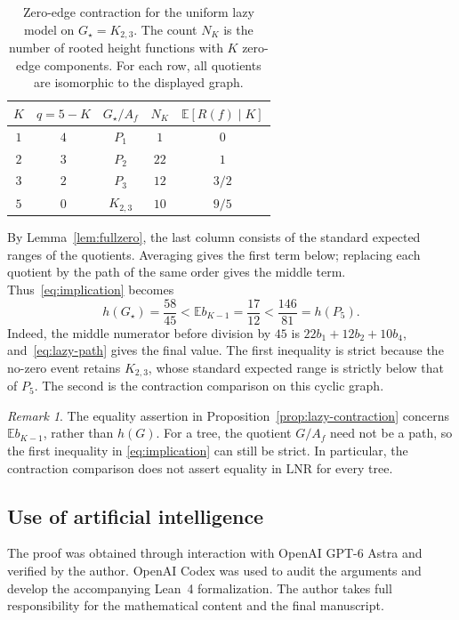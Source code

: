 \documentclass[11pt,reqno]{amsart}
\theoremstyle{remark}
\newtheorem{remark}[theorem]{Remark}
\numberwithin{equation}{section}
\newcommand{\E}{\mathbb E}
\begin{document}
\begin{table}[htbp]
\centering
\caption{Zero-edge contraction for the uniform lazy model on
$G_\star=K_{2,3}$. The count $N_K$ is the number of rooted height
functions with $K$ zero-edge components. For each row, all quotients
are isomorphic to the displayed graph.}
\label{tab:running-lazy}
\smallskip
\begin{tabular}{ccccc}
\toprule
$K$ & $q=5-K$ & $G_\star/A_f$ & $N_K$ &
 $\E[R(f)\mid K]$ \\
\midrule
$1$ & $4$ & $P_1$       & $1$  & $0$ \\
$2$ & $3$ & $P_2$       & $22$ & $1$ \\
$3$ & $2$ & $P_3$       & $12$ & $3/2$ \\
$5$ & $0$ & $K_{2,3}$   & $10$ & $9/5$ \\
\bottomrule
\end{tabular}
\end{table}

By Lemma~\ref{lem:fullzero}, the last column consists of the standard
expected ranges of the quotients. Averaging gives the first term
below; replacing each quotient by the path of the same order gives
the middle term. Thus~\eqref{eq:implication} becomes
\[
 h(G_\star)=\frac{58}{45}
   <\E b_{K-1}=\frac{17}{12}
   <\frac{146}{81}=h(P_5).
\]
Indeed, the middle numerator before division by $45$ is
$22b_1+12b_2+10b_4$, and~\eqref{eq:lazy-path} gives the final value.
The first inequality is strict because the no-zero event retains
$K_{2,3}$, whose standard expected range is strictly below that of
$P_5$. The second is the contraction comparison on this cyclic graph.


\begin{remark}
The equality assertion in Proposition~\ref{prop:lazy-contraction}
concerns $\E b_{K-1}$, rather than $h(G)$. For a tree, the quotient
$G/A_f$ need not be a path, so the first inequality in
\eqref{eq:implication} can still be strict. In particular, the
contraction comparison does not assert equality in LNR for every tree.
\end{remark}

\subsection*{Use of artificial intelligence}
The proof was obtained through interaction with OpenAI GPT-6 Astra
and verified by the author. OpenAI Codex was used to audit the arguments
and develop the accompanying Lean~4 formalization. The author takes
full responsibility for the mathematical content and the final manuscript.



\end{document}
